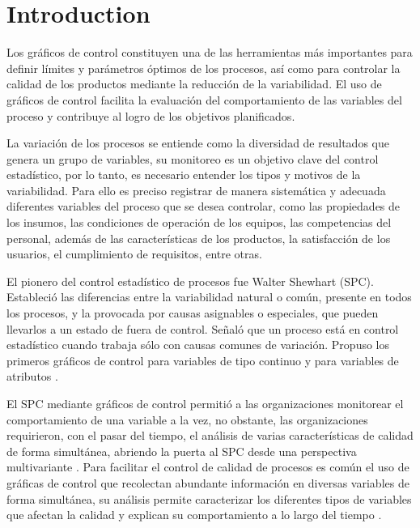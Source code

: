 \documentclass[mathematics,article,submit,moreauthors,pdftex]{mdpi}
\begin{document}

\hypertarget{introduction}{%
\section{Introduction}\label{introduction}}

Los gráficos de control constituyen una de las herramientas más
importantes para definir límites y parámetros óptimos de los procesos,
así como para controlar la calidad de los productos mediante la
reducción de la variabilidad. El uso de gráficos de control facilita la
evaluación del comportamiento de las variables del proceso y contribuye
al logro de los objetivos planificados.

La variación de los procesos se entiende como la diversidad de
resultados que genera un grupo de variables, su monitoreo es un objetivo
clave del control estadístico, por lo tanto, es necesario entender los
tipos y motivos de la variabilidad. Para ello es preciso registrar de
manera sistemática y adecuada diferentes variables del proceso que se
desea controlar, como las propiedades de los insumos, las condiciones de
operación de los equipos, las competencias del personal, además de las
características de los productos, la satisfacción de los usuarios, el
cumplimiento de requisitos, entre otras.

El pionero del control estadístico de procesos fue Walter Shewhart
(SPC). Estableció las diferencias entre la variabilidad natural o común,
presente en todos los procesos, y la provocada por causas asignables o
especiales, que pueden llevarlos a un estado de fuera de control. Señaló
que un proceso está en control estadístico cuando trabaja sólo con
causas comunes de variación. Propuso los primeros gráficos de control
para variables de tipo continuo y para variables de atributos
\citep{Gutierrez2013}.

El SPC mediante gráficos de control permitió a las organizaciones
monitorear el comportamiento de una variable a la vez, no obstante, las
organizaciones requirieron, con el pasar del tiempo, el análisis de
varias características de calidad de forma simultánea, abriendo la
puerta al SPC desde una perspectiva multivariante \citep{ramos2017}.
Para facilitar el control de calidad de procesos es común el uso de
gráficas de control que recolectan abundante información en diversas
variables de forma simultánea, su análisis permite caracterizar los
diferentes tipos de variables que afectan la calidad y explican su
comportamiento a lo largo del tiempo \citep{li2012}.
\end{document}
